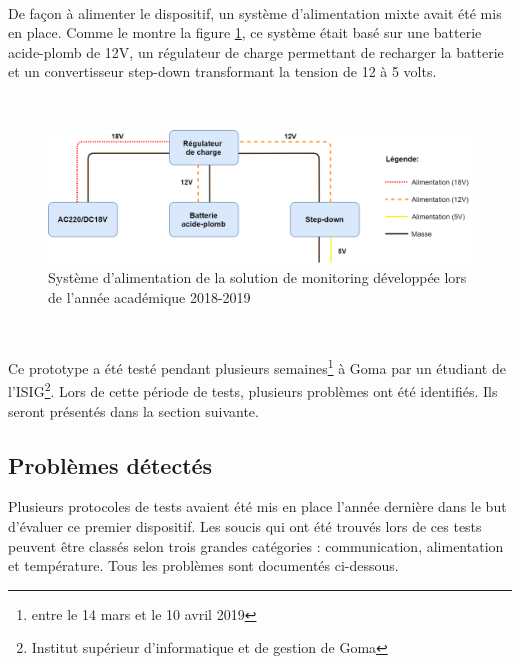 ~

\noindent
De façon à alimenter le dispositif, un système d’alimentation mixte avait été mis en place. Comme le montre la figure \ref{fig:power_source}, ce système était basé sur une batterie acide-plomb de 12V, un régulateur de charge permettant de recharger la batterie et un convertisseur step-down transformant la tension de 12 à 5 volts.

~

\begin{figure}[ht!]
  \includegraphics[width=\textwidth]{img/el_prototype/power_source.png}
  \caption{Système d'alimentation de la solution de monitoring développée lors de l'année académique 2018-2019}
  \label{fig:power_source}
\end{figure}

~

\noindent
Ce prototype a été testé pendant plusieurs semaines\footnote{entre le 14 mars et le 10 avril 2019} à Goma par un étudiant de l’ISIG\footnote{Institut supérieur d'informatique et de gestion de Goma}. Lors de cette période de tests, plusieurs problèmes ont été identifiés. Ils seront présentés dans la section suivante.

\subsection{Problèmes détectés}

Plusieurs protocoles de tests avaient été mis en place l’année dernière dans le but d'évaluer ce premier dispositif. Les soucis qui ont été trouvés lors de ces tests peuvent être classés selon trois grandes catégories : communication, alimentation et température. Tous les problèmes sont documentés ci-dessous.

